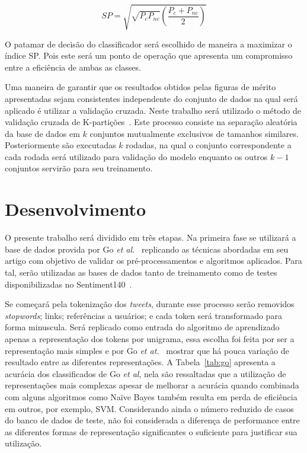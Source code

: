 \begin{equation} \label{eq:sp}
    SP = \sqrt{\sqrt{P_c P_{nc}} \left(\frac{P_c + P_{nc}}{2}\right)}
\end{equation}

O patamar de decisão do classificador será escolhido de maneira a maximizar o índice SP.
Pois este será um ponto de operação que apresenta um compromisso entre a eficiência de ambas as classes.

Uma maneira de garantir que os resultados obtidos pelas figuras de mérito apresentadas sejam consistentes independente do
conjunto de dados na qual será aplicado é utilizar a validação cruzada.
Neste trabalho será utilizado o método de validação cruzada de K-partições~\cite{kohavi95}.
Este processo consiste na separação aleatória da base de dados em $k$ conjuntos mutualmente exclusivos de tamanhos
similares.
Posteriormente são executadas $k$ rodadas, na qual o conjunto correspondente a cada rodada será utilizado para validação
do modelo enquanto os outros $k-1$ conjuntos servirão para seu treinamento.

\section{Desenvolvimento} \label{sec:desenvolvimento}

O presente trabalho será dividido em três etapas.
Na primeira fase se utilizará a base de dados provida por Go \textit{et al.}~\cite{go09} replicando as técnicas
abordadas em seu artigo com objetivo de validar os pré-processamentos e algoritmos aplicados.
Para tal, serão utilizadas as bases de dados tanto de treinamento como de testes disponibilizadas no
Sentiment140~\cite{go09}.

Se começará pela tokenização dos \textit{tweets}, durante esse processo serão removidos \textit{stopwords}; links;
referências a usuários; e cada token será transformado para forma minuscula.
Será replicado como entrada do algoritmo de aprendizado apenas a representação dos tokens por unigrama, essa escolha foi
feita por ser a representação mais simples e por Go \textit{et at.}~\cite{go09} mostrar que há pouca variação de
resultado entre as diferentes representações.
A Tabela~\ref{tab:go} apresenta a acurácia dos classificados de Go \textit{et al}, nela são ressaltadas que a utilização
de representações mais complexas apesar de melhorar a acurácia quando combinada com alguns algoritmos como Naïve Bayes
também resulta em perda de eficiência em outros, por exemplo, SVM.
Considerando ainda o número reduzido de casos do banco de dados de teste, não foi considerada a diferença de performance
entre as diferentes formas de representação significantes o suficiente para justificar sua utilização.

